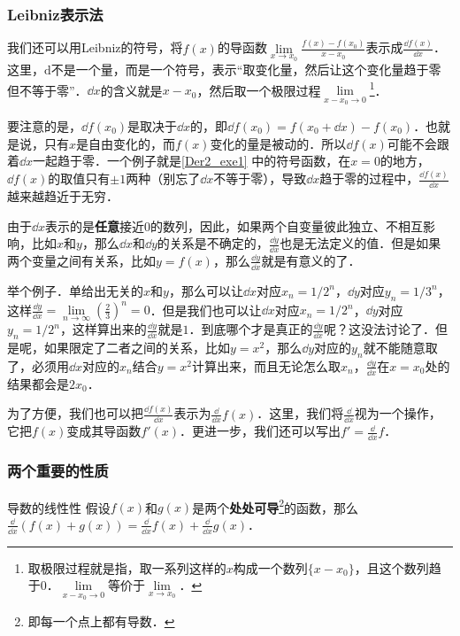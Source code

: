 \subsubsection{Leibniz表示法}


我们还可以用Leibniz的符号，将$f(x)$的导函数$\lim\limits_{x\to x_0}\frac{f(x)-f(x_0)}{x-x_0}$表示成$\frac{\dd f(x)}{\dd x}$．这里，$\mathrm{d}$不是一个量，而是一个符号，表示“取变化量，然后让这个变化量趋于零但不等于零”．$\dd x$的含义就是$x-x_0$，然后取一个极限过程$\lim\limits_{x-x_0\to 0}$\footnote{取极限过程就是指，取一系列这样的$x$构成一个数列$\{x-x_0\}$，且这个数列趋于$0$．$\lim\limits_{x-x_0\to 0}$等价于$\lim\limits_{x\to x_0}$．}．

要注意的是，$\dd f(x_0)$是取决于$\dd x$的，即$\dd f(x_0)=f(x_0+\dd x)-f(x_0)$．也就是说，只有$x$是自由变化的，而$f(x)$变化的量是被动的．所以$\dd f(x)$可能不会跟着$\dd x$一起趋于零．一个例子就是\autoref{Der2_exe1} 中的符号函数，在$x=0$的地方，$\dd f(x)$的取值只有$\pm 1$两种（别忘了$\dd x$不等于零），导致$\dd x$趋于零的过程中，$\frac{\dd f(x)}{\dd x}$越来越趋近于无穷．


由于$\dd x$表示的是\textbf{任意}接近$0$的数列，因此，如果两个自变量彼此独立、不相互影响，比如$x$和$y$，那么$\dd x$和$\dd y$的关系是不确定的，$\frac{\dd y}{\dd x}$也是无法定义的值．但是如果两个变量之间有关系，比如$y=f(x)$，那么$\frac{\dd y}{\dd x}$就是有意义的了．

举个例子．单给出无关的$x$和$y$，那么可以让$\dd x$对应$x_n=1/2^n$，$\dd y$对应$y_n=1/3^n$，这样$\frac{\dd y}{\dd x}=\lim\limits_{n\to\infty}(\frac{2}{3})^n=0$．但是我们也可以让$\dd x$对应$x_n=1/2^n$，$\dd y$对应$y_n=1/2^n$，这样算出来的$\frac{\dd y}{\dd x}$就是$1$．到底哪个才是真正的$\frac{\dd y}{\dd x}$呢？这没法讨论了．但是呢，如果限定了二者之间的关系，比如$y=x^2$，那么$\dd y$对应的$y_n$就不能随意取了，必须用$\dd x$对应的$x_n$结合$y=x^2$计算出来，而且无论怎么取$x_n$，$\frac{\dd y}{\dd x}$在$x=x_0$处的结果都会是$2x_0$．

为了方便，我们也可以把$\frac{\dd f(x)}{\dd x}$表示为$\frac{\dd}{\dd x}f(x)$．这里，我们将$\frac{\dd}{\dd x}$视为一个操作，它把$f(x)$变成其导函数$f'(x)$．更进一步，我们还可以写出$f'=\frac{\dd}{\dd x}f$．


\subsubsection{两个重要的性质}

\begin{theorem}{导数的线性性}
假设$f(x)$和$g(x)$是两个\textbf{处处可导}\footnote{即每一个点上都有导数．}的函数，那么$\frac{\dd}{\dd x}(f(x)+g(x))=\frac{\dd}{\dd x}f(x)+\frac{\dd}{\dd x}g(x)$．
\end{theorem}

